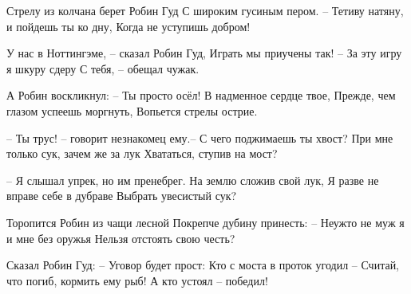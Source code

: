 \begin{flushleft}
Стрелу из колчана берет Робин Гуд \linebreak
С широким гусиным пером. \linebreak
– Тетиву натяну, и пойдешь ты ко дну, \linebreak
Когда не уступишь добром! \linebreak

У нас в Ноттингэме, – сказал Робин Гуд, \linebreak
Играть мы приучены так! \linebreak
– За эту игру я шкуру сдеру \linebreak
С тебя, – обещал чужак. \linebreak

\newpage

А Робин воскликнул: – Ты просто осёл! \linebreak
В надменное сердце твое, \linebreak
Прежде, чем глазом успеешь моргнуть, \linebreak
Вопьется стрелы острие. \linebreak

– Ты трус! – говорит незнакомец ему.– \linebreak
С чего поджимаешь ты хвост? \linebreak
При мне только сук, зачем же за лук \linebreak
Хвататься, ступив на мост? \linebreak

– Я слышал упрек, но им пренебрег. \linebreak
На землю сложив свой лук, \linebreak
Я разве не вправе себе в дубраве \linebreak
Выбрать увесистый сук? \linebreak

Торопится Робин из чащи лесной \linebreak
Покрепче дубину принесть: \linebreak
– Неужто не муж я и мне без оружья \linebreak
Нельзя отстоять свою честь? \linebreak

Сказал Робин Гуд: – Уговор будет прост: \linebreak
Кто с моста в проток угодил – \linebreak
Считай, что погиб, кормить ему рыб! \linebreak
А кто устоял – победил! \linebreak


\end{flushleft}
